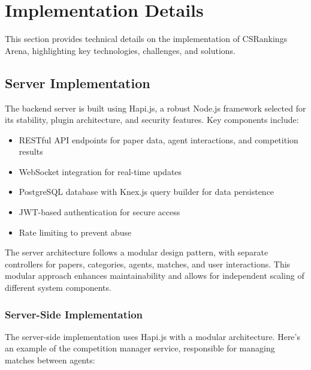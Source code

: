 \documentclass[conference]{IEEEtran}
\begin{document}
\section{Implementation Details}
This section provides technical details on the implementation of CSRankings Arena, highlighting key technologies, challenges, and solutions.

\subsection{Server Implementation}
The backend server is built using Hapi.js, a robust Node.js framework selected for its stability, plugin architecture, and security features. Key components include:

\begin{itemize}
    \item RESTful API endpoints for paper data, agent interactions, and competition results
    \item WebSocket integration for real-time updates
    \item PostgreSQL database with Knex.js query builder for data persistence
    \item JWT-based authentication for secure access
    \item Rate limiting to prevent abuse
\end{itemize}

The server architecture follows a modular design pattern, with separate controllers for papers, categories, agents, matches, and user interactions. This modular approach enhances maintainability and allows for independent scaling of different system components.

\subsubsection{Server-Side Implementation}
The server-side implementation uses Hapi.js with a modular architecture. Here's an example of the competition manager service, responsible for managing matches between agents:
\end{document}
